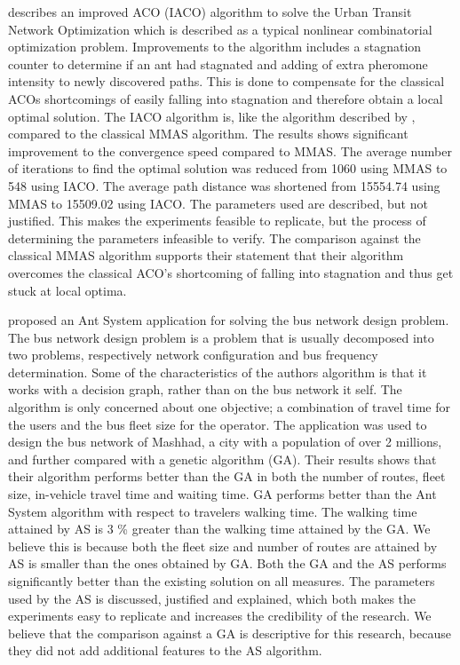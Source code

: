 \citet{jiang10} describes an improved ACO (IACO) algorithm to solve the Urban Transit Network Optimization which is described as a typical nonlinear combinatorial optimization problem. Improvements to the algorithm includes a stagnation counter to determine if an ant had stagnated and adding of extra pheromone intensity to newly discovered paths. This is done to compensate for the classical ACOs shortcomings of easily falling into stagnation and therefore obtain a local optimal solution. The IACO algorithm is, like the algorithm described by \citet{yang07}, compared to the classical MMAS algorithm. The results shows significant improvement to the convergence speed compared to MMAS. The average number of iterations to find the optimal solution was reduced from 1060 using MMAS to 548 using IACO. The average path distance was shortened from 15554.74 using MMAS to 15509.02 using IACO. The parameters used are described, but not justified. This makes the experiments feasible to replicate, but the process of determining the parameters infeasible to verify. The comparison against the classical MMAS algorithm supports their statement that their algorithm overcomes the classical ACO's shortcoming of falling into stagnation and thus get stuck at local optima. 

\citet{poorzahedy11} proposed an Ant System application for solving the bus network design problem. The bus network design problem is a problem that is usually decomposed into two problems, respectively network configuration and bus frequency determination. Some of the characteristics of the authors algorithm is that it works with a decision graph, rather than on the bus network it self. The algorithm is only concerned about one objective; a combination of travel time for the users and the bus fleet size for the operator. The application was used to design the bus network of Mashhad, a city with a population of over 2 millions, and further compared with a genetic algorithm (GA). Their results shows that their algorithm performs better than the GA in both the number of routes, fleet size, in-vehicle travel time and waiting time. GA performs better than the Ant System algorithm with respect to travelers walking time. The walking time attained by AS is 3 \% greater than the walking time attained by the GA. We believe this is because both the fleet size and number of routes are attained by AS is smaller than the ones obtained by GA. Both the GA and the AS performs significantly better than the existing solution on all measures. The parameters used by the AS is discussed, justified and explained, which both makes the experiments easy to replicate and increases the credibility of the research. We believe that the comparison against a GA is descriptive for this research, because they did not add additional features to the AS algorithm. 

